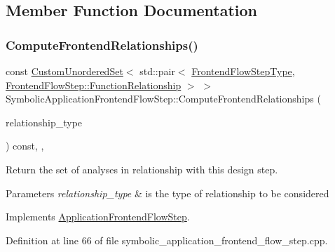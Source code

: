 \subsection{Member Function Documentation}
\mbox{\label{classSymbolicApplicationFrontendFlowStep_a22caf3d46c83bf130e8134d592377130}} 
\subsubsection{\texorpdfstring{Compute\+Frontend\+Relationships()}{ComputeFrontendRelationships()}}
{\footnotesize\ttfamily const \hyperlink{classCustomUnorderedSet}{Custom\+Unordered\+Set}$<$ std\+::pair$<$ \hyperlink{frontend__flow__step_8hpp_afeb3716c693d2b2e4ed3e6d04c3b63bb}{Frontend\+Flow\+Step\+Type}, \hyperlink{classFrontendFlowStep_af7cf30f2023e5b99e637dc2058289ab0}{Frontend\+Flow\+Step\+::\+Function\+Relationship} $>$ $>$ Symbolic\+Application\+Frontend\+Flow\+Step\+::\+Compute\+Frontend\+Relationships (\begin{DoxyParamCaption}\item[{const \hyperlink{classDesignFlowStep_a723a3baf19ff2ceb77bc13e099d0b1b7}{Design\+Flow\+Step\+::\+Relationship\+Type}}]{relationship\+\_\+type }\end{DoxyParamCaption}) const\hspace{0.3cm}{\ttfamily [override]}, {\ttfamily [private]}, {\ttfamily [virtual]}}



Return the set of analyses in relationship with this design step. 


\begin{DoxyParams}{Parameters}
{\em relationship\+\_\+type} & is the type of relationship to be considered \\
\hline
\end{DoxyParams}


Implements \hyperlink{classApplicationFrontendFlowStep_ab308200c0096ccff3a1ff50e864ed61f}{Application\+Frontend\+Flow\+Step}.



Definition at line 66 of file symbolic\+\_\+application\+\_\+frontend\+\_\+flow\+\_\+step.\+cpp.



